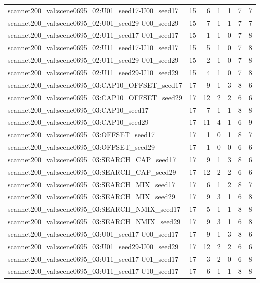 \begin{table}[t]
\begin{tabular}{lrrrrrr}
scannet200\_val:scene0695\_02:U01\_seed17-U00\_seed17 & 15 & 6 & 1 & 1 & 7 & 7 \\
scannet200\_val:scene0695\_02:U01\_seed29-U00\_seed29 & 15 & 7 & 1 & 1 & 7 & 7 \\
scannet200\_val:scene0695\_02:U11\_seed17-U01\_seed17 & 15 & 1 & 1 & 0 & 7 & 8 \\
scannet200\_val:scene0695\_02:U11\_seed17-U10\_seed17 & 15 & 5 & 1 & 0 & 7 & 8 \\
scannet200\_val:scene0695\_02:U11\_seed29-U01\_seed29 & 15 & 2 & 1 & 0 & 7 & 8 \\
scannet200\_val:scene0695\_02:U11\_seed29-U10\_seed29 & 15 & 4 & 1 & 0 & 7 & 8 \\
scannet200\_val:scene0695\_03:CAP10\_OFFSET\_seed17 & 17 & 9 & 1 & 3 & 8 & 6 \\
scannet200\_val:scene0695\_03:CAP10\_OFFSET\_seed29 & 17 & 12 & 2 & 2 & 6 & 6 \\
scannet200\_val:scene0695\_03:CAP10\_seed17 & 17 & 7 & 1 & 1 & 8 & 8 \\
scannet200\_val:scene0695\_03:CAP10\_seed29 & 17 & 11 & 4 & 1 & 6 & 9 \\
scannet200\_val:scene0695\_03:OFFSET\_seed17 & 17 & 1 & 0 & 1 & 8 & 7 \\
scannet200\_val:scene0695\_03:OFFSET\_seed29 & 17 & 1 & 0 & 0 & 6 & 6 \\
scannet200\_val:scene0695\_03:SEARCH\_CAP\_seed17 & 17 & 9 & 1 & 3 & 8 & 6 \\
scannet200\_val:scene0695\_03:SEARCH\_CAP\_seed29 & 17 & 12 & 2 & 2 & 6 & 6 \\
scannet200\_val:scene0695\_03:SEARCH\_MIX\_seed17 & 17 & 6 & 1 & 2 & 8 & 7 \\
scannet200\_val:scene0695\_03:SEARCH\_MIX\_seed29 & 17 & 9 & 3 & 1 & 6 & 8 \\
scannet200\_val:scene0695\_03:SEARCH\_NMIX\_seed17 & 17 & 5 & 1 & 1 & 8 & 8 \\
scannet200\_val:scene0695\_03:SEARCH\_NMIX\_seed29 & 17 & 9 & 3 & 1 & 6 & 8 \\
scannet200\_val:scene0695\_03:U01\_seed17-U00\_seed17 & 17 & 9 & 1 & 3 & 8 & 6 \\
scannet200\_val:scene0695\_03:U01\_seed29-U00\_seed29 & 17 & 12 & 2 & 2 & 6 & 6 \\
scannet200\_val:scene0695\_03:U11\_seed17-U01\_seed17 & 17 & 3 & 2 & 0 & 6 & 8 \\
scannet200\_val:scene0695\_03:U11\_seed17-U10\_seed17 & 17 & 6 & 1 & 1 & 8 & 8 \\

\end{tabular}
\end{table}

